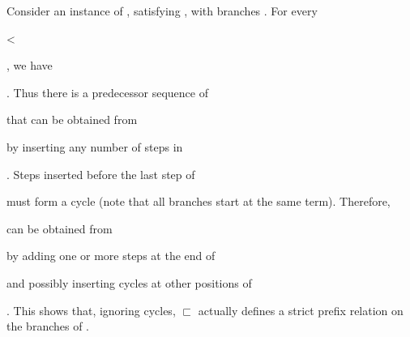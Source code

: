 Consider an instance of
, satisfying
, with branches
. For every \begin{coqdoccode} <
  \end{coqdoccode}, we
have \begin{coqdoccode} 
   
  \end{coqdoccode}. Thus there is a predecessor
sequence %
of \begin{coqdoccode}
  \end{coqdoccode} that can be obtained
from \begin{coqdoccode}
  \end{coqdoccode} by inserting any number of steps
in \begin{coqdoccode}
  \end{coqdoccode}. Steps inserted before the last
step of \begin{coqdoccode}
  \end{coqdoccode} must form a cycle (note that all
branches start at the same %
term). Therefore, \begin{coqdoccode}
  \end{coqdoccode} can be obtained
from \begin{coqdoccode}
  \end{coqdoccode} by adding one or more steps at
the end of \begin{coqdoccode}
  \end{coqdoccode} and possibly inserting cycles at
other positions of \begin{coqdoccode}
  \end{coqdoccode}. This shows that, ignoring
cycles, $\sqsubset$ actually defines a strict prefix relation on the
branches of .

%
%


